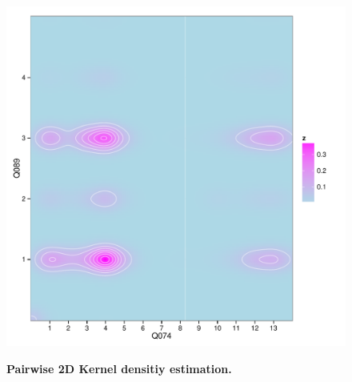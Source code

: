 \begin{figure}[t!]
\begin{minipage}[t]{0.33\textwidth}
    \label{subfig:hierarchy4}
  \end{minipage}
  \begin{minipage}[t]{0.36\textwidth}
    \centering
    \includegraphics[width=\columnwidth,height=0.8\columnwidth]{fig/2dhist_q074_q089.pdf}
    \label{subfig:hierarchy}
  \end{minipage}
  \caption{\textbf{Pairwise 2D Kernel densitiy estimation.}}
  \label{fig:question distribution}
\end{figure}




